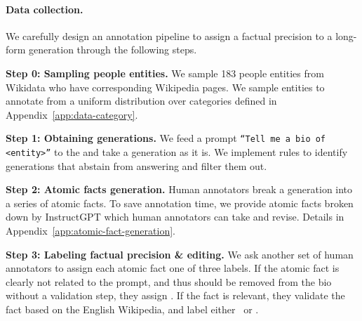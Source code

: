 \paragraph{Data collection.}
We carefully design an annotation pipeline to assign a factual precision to a long-form generation through the following steps.

\vspace{.4em}
\noindent \textbf{Step 0: Sampling people entities.}
We sample 183 people entities from Wikidata who have %
corresponding Wikipedia pages.
We sample entities to annotate from a uniform distribution over categories defined in Appendix~\ref{app:data-category}. %

\vspace{.4em}
\noindent \textbf{Step 1: Obtaining generations.} We feed a prompt \texttt{``Tell me a bio of <entity>''} to the \subjectLM{} and take a generation as it is. %
We implement rules to identify generations that abstain from answering and filter them out. %

\vspace{.4em}
\noindent \textbf{Step 2: Atomic facts generation.}
Human annotators break a generation into a series of atomic facts.
To save annotation time, we provide atomic facts broken down by InstructGPT which human annotators can take and revise. Details in Appendix~\ref{app:atomic-fact-generation}.

\vspace{.4em}
\noindent \textbf{Step 3: Labeling factual precision \& editing.}
We ask another set of human annotators to assign each atomic fact one of three labels. If the atomic fact is clearly not related to the prompt, and thus should be removed from the bio without a validation step, they assign \irLabel. If the fact is relevant, they validate the fact based on the English Wikipedia, and label either \sLabel\ or \nsLabel. %

